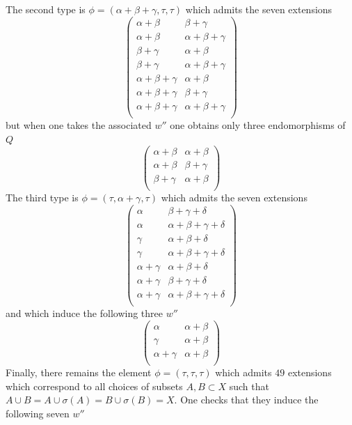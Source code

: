 \documentclass[12pt]{article}
\begin{document}
 The second type is $\phi=(\alpha +\beta +\gamma ,\tau ,\tau)$ which admits the seven extensions 
 $$
 \left(
\begin{array}{cc}
 \alpha +\beta  & \beta +\gamma  \\
 \alpha +\beta  & \alpha +\beta +\gamma  \\
 \beta +\gamma  & \alpha +\beta  \\
 \beta +\gamma  & \alpha +\beta +\gamma  \\
 \alpha +\beta +\gamma  & \alpha +\beta  \\
 \alpha +\beta +\gamma  & \beta +\gamma  \\
 \alpha +\beta +\gamma  & \alpha +\beta +\gamma  \\
\end{array}
\right)
$$
but when one takes the associated $w''$ one obtains only three endomorphisms of $Q$
 $$
 \left(
\begin{array}{cc}
 \alpha +\beta  & \alpha +\beta  \\
 \alpha +\beta  & \beta +\gamma  \\
 \beta +\gamma  & \alpha +\beta  \\
\end{array}
\right)
$$
The third type is $\phi=(\tau,\alpha +\gamma ,\tau)$ which admits the seven extensions 
 $$
 \left(
\begin{array}{cc}
 \alpha  & \beta +\gamma +\delta  \\
 \alpha  & \alpha +\beta +\gamma +\delta  \\
 \gamma  & \alpha +\beta +\delta  \\
 \gamma  & \alpha +\beta +\gamma +\delta  \\
 \alpha +\gamma  & \alpha +\beta +\delta  \\
 \alpha +\gamma  & \beta +\gamma +\delta  \\
 \alpha +\gamma  & \alpha +\beta +\gamma +\delta  \\
\end{array}
\right) 
$$
and which induce the following three $w''$
$$
\left(
\begin{array}{cc}
 \alpha  & \alpha +\beta  \\
 \gamma  & \alpha +\beta  \\
 \alpha +\gamma  & \alpha +\beta  \\
\end{array}
\right)
$$
Finally, there remains the element $\phi=(\tau,\tau,\tau)$ which admits $49$ extensions which correspond to all choices of subsets $A,B\subset X$ such that $A\cup B=A\cup\sigma(A)=B\cup\sigma(B)=X$. One checks that they induce the following seven $w''$
\end{document}
